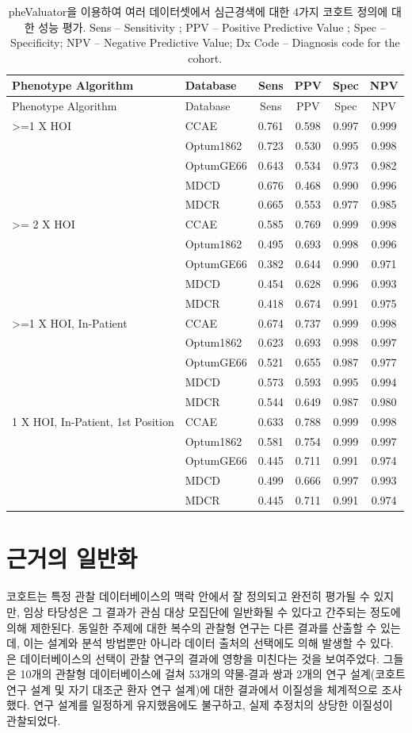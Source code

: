 \documentclass[11pt]{book}
\theoremstyle{definition}
\theoremstyle{definition}
\theoremstyle{definition}
\theoremstyle{remark}
\begin{document}
\begin{longtable}[]{@{}llcccc@{}}
\caption{\label{tab:phevalStats} pheValuator을 이용하여 여러 데이터셋에서
심근경색에 대한 4가지 코호트 정의에 대한 성능 평가. Sens -- Sensitivity
; PPV -- Positive Predictive Value ; Spec -- Specificity; NPV --
Negative Predictive Value; Dx Code -- Diagnosis code for the
cohort.}\tabularnewline
\toprule
Phenotype Algorithm & Database & Sens & PPV & Spec & NPV\tabularnewline
\midrule
\endfirsthead
\toprule
Phenotype Algorithm & Database & Sens & PPV & Spec & NPV\tabularnewline
\midrule
\endhead
\textgreater{}=1 X HOI & CCAE & 0.761 & 0.598 & 0.997 &
0.999\tabularnewline
& Optum1862 & 0.723 & 0.530 & 0.995 & 0.998\tabularnewline
& OptumGE66 & 0.643 & 0.534 & 0.973 & 0.982\tabularnewline
& MDCD & 0.676 & 0.468 & 0.990 & 0.996\tabularnewline
& MDCR & 0.665 & 0.553 & 0.977 & 0.985\tabularnewline
\textgreater{}= 2 X HOI & CCAE & 0.585 & 0.769 & 0.999 &
0.998\tabularnewline
& Optum1862 & 0.495 & 0.693 & 0.998 & 0.996\tabularnewline
& OptumGE66 & 0.382 & 0.644 & 0.990 & 0.971\tabularnewline
& MDCD & 0.454 & 0.628 & 0.996 & 0.993\tabularnewline
& MDCR & 0.418 & 0.674 & 0.991 & 0.975\tabularnewline
\textgreater{}=1 X HOI, In-Patient & CCAE & 0.674 & 0.737 & 0.999 &
0.998\tabularnewline
& Optum1862 & 0.623 & 0.693 & 0.998 & 0.997\tabularnewline
& OptumGE66 & 0.521 & 0.655 & 0.987 & 0.977\tabularnewline
& MDCD & 0.573 & 0.593 & 0.995 & 0.994\tabularnewline
& MDCR & 0.544 & 0.649 & 0.987 & 0.980\tabularnewline
1 X HOI, In-Patient, 1st Position & CCAE & 0.633 & 0.788 & 0.999 &
0.998\tabularnewline
& Optum1862 & 0.581 & 0.754 & 0.999 & 0.997\tabularnewline
& OptumGE66 & 0.445 & 0.711 & 0.991 & 0.974\tabularnewline
& MDCD & 0.499 & 0.666 & 0.997 & 0.993\tabularnewline
& MDCR & 0.445 & 0.711 & 0.991 & 0.974\tabularnewline
\bottomrule
\end{longtable}

\section{근거의 일반화}\label{GeneralizabilityOfEvidence}

코호트는 특정 관찰 데이터베이스의 맥락 안에서 잘 정의되고 완전히 평가될
수 있지만, 임상 타당성은 그 결과가 관심 대상 모집단에 일반화될 수 있다고
간주되는 정도에 의해 제한된다. 동일한 주제에 대한 복수의 관찰형 연구는
다른 결과를 산출할 수 있는데, 이는 설계와 분석 방법뿐만 아니라 데이터
출처의 선택에도 의해 발생할 수 있다. \citet{madigan_2013} 은
데이터베이스의 선택이 관찰 연구의 결과에 영향을 미친다는 것을
보여주었다. 그들은 10개의 관찰형 데이터베이스에 걸쳐 53개의 약물-결과
쌍과 2개의 연구 설계(코호트 연구 설계 및 자기 대조군 환자 연구 설계)에
대한 결과에서 이질성을 체계적으로 조사했다. 연구 설계를 일정하게
유지했음에도 불구하고, 실제 추정치의 상당한 이질성이 관찰되었다.
\end{document}
